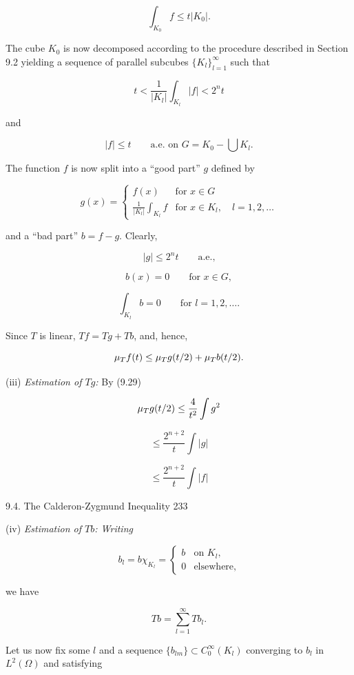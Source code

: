 \[
\int_{K_0} f \le t|K_0|.
\]

The cube $K_0$ is now decomposed according to the procedure described in Section 9.2 yielding a sequence of parallel subcubes $\{K_l\}_{l=1}^{\infty}$ such that

\begin{equation}
t < \frac{1}{|K_l|}\int_{K_l} |f| < 2^n t
\tag{9.31}
\end{equation}

and

\[
|f|\le t \qquad \text{a.e. on } G = K_0 - \bigcup K_l.
\]

The function $f$ is now split into a ``good part'' $g$ defined by

\[
g(x)=
\begin{cases}
f(x) & \text{for } x\in G \\
\frac{1}{|K_l|}\int_{K_l} f & \text{for } x\in K_l,\quad l=1,2,\ldots
\end{cases}
\]

and a ``bad part'' $b=f-g$. Clearly,

\[
|g|\le 2^n t \qquad \text{a.e.,}
\]

\[
b(x)=0 \qquad \text{for } x\in G,
\]

\[
\int_{K_l} b=0 \qquad \text{for } l=1,2,\ldots .
\]

Since $T$ is linear, $Tf=Tg+Tb$, and, hence,

\[
\mu_T f(t)\le \mu_T g(t/2)+\mu_T b(t/2).
\]

\noindent (iii) \textit{Estimation of $Tg$:} By (9.29)

\[
\mu_T g(t/2)\le \frac{4}{t^2}\int g^2
\]

\[
\le \frac{2^{n+2}}{t}\int |g|
\]

\[
\le \frac{2^{n+2}}{t}\int |f|
\]



9.4. The Calderon-Zygmund Inequality \hfill 233

(iv) \textit{Estimation of $Tb$: Writing}

\[
b_l = b\chi_{K_l} =
\begin{cases}
b & \text{on } K_l,\\
0 & \text{elsewhere,}
\end{cases}
\]

we have

\[
Tb = \sum_{l=1}^{\infty} Tb_l.
\]

Let us now fix some $l$ and a sequence $\{b_{lm}\} \subset C_0^{\infty}(K_l)$ converging to $b_l$ in $L^2(\Omega)$ and
satisfying

